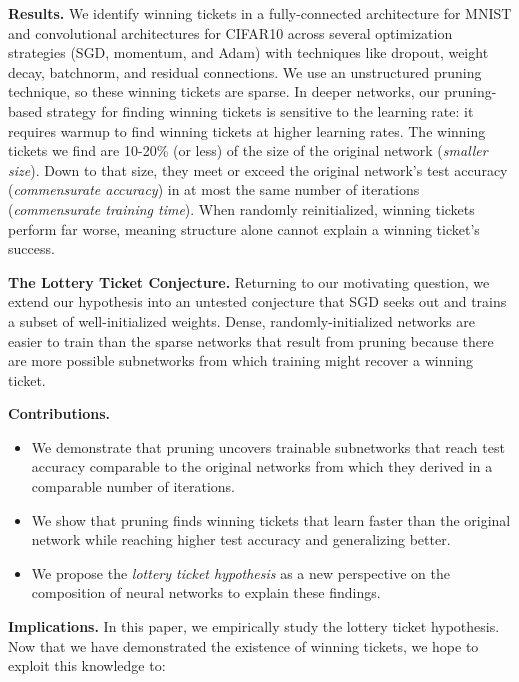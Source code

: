 \textbf{Results.} We identify winning tickets in a fully-connected
architecture for MNIST and convolutional architectures for CIFAR10 across several optimization strategies (SGD, momentum, and Adam) with
techniques like dropout, weight decay, batchnorm, and residual connections. We use an unstructured pruning technique, so these winning tickets are sparse.
In deeper networks, our pruning-based strategy for finding winning tickets is sensitive to
the learning rate: it requires warmup to find winning tickets at higher learning rates.
The winning tickets we find are 10-20\% (or less) of the size of the original network (\emph{smaller size}). 
Down to that size,
they meet or exceed the original network's test accuracy (\emph{commensurate accuracy}) in at most the same number of iterations (\emph{commensurate training time}).
When randomly reinitialized, winning tickets
perform far worse, meaning structure alone cannot explain a winning ticket's success.

\textbf{The Lottery Ticket Conjecture.} Returning to our motivating question, we
extend our hypothesis into an untested conjecture that
SGD seeks out and trains a subset of well-initialized weights.
Dense, randomly-initialized networks are easier to train than the sparse networks that result from pruning because
there are more possible subnetworks from which training might recover a winning ticket.

\textbf{Contributions.}
\vspace{-.5em}
\begin{itemize}
\item We demonstrate that pruning uncovers trainable subnetworks that reach test accuracy comparable to the original
networks from which they derived in a comparable number of iterations.
\item We show that pruning finds winning tickets that learn faster than the original network while reaching higher test accuracy and generalizing better.
\item We propose the \emph{lottery ticket hypothesis} as a new perspective on the composition of neural networks to explain these findings.
\end{itemize}
\vspace{-.5em}
\textbf{Implications.} In this paper, we empirically study the lottery ticket hypothesis. Now that we have demonstrated the existence of winning tickets, we hope to exploit this knowledge to:

